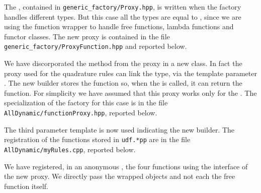 The , contained in \texttt{generic\_factory/Proxy.hpp},
is written when the factory handles different types.
But this case all the types are equal to , since we are using the function wrapper to handle free functions, lambda
functions and functor classes. The new proxy is contained in the file
\texttt{generic\_factory/ProxyFunction.hpp} and reported below.
\lstset{basicstyle=\scriptsize\sf}

\lstset{basicstyle=\sf}
We have discorporated the  method  from the proxy in a
new class. In fact the proxy used for the quadrature rules can link the type,
via the template parameter . The new builder stores the
function so, when the  is called, it can return the function.
For simplicity we have assumed that this proxy works only for the . The specialization of the factory for this case is in the file
\texttt{AllDynamic/functionProxy.hpp}, reported below.
\lstset{basicstyle=\scriptsize\sf}

\lstset{basicstyle=\sf}
The third parameter template is now used indicating the new builder.
The registration of the functions stored in \texttt{udf.*pp} are
in the file \texttt{AllDynamic/myRules.cpp}, reported below.
\lstset{basicstyle=\scriptsize\sf}

\lstset{basicstyle=\sf}
We have registered, in an anonymous , the four functions using
the interface of the new proxy. We directly pass the wrapped objects and not
each the free function itself.
